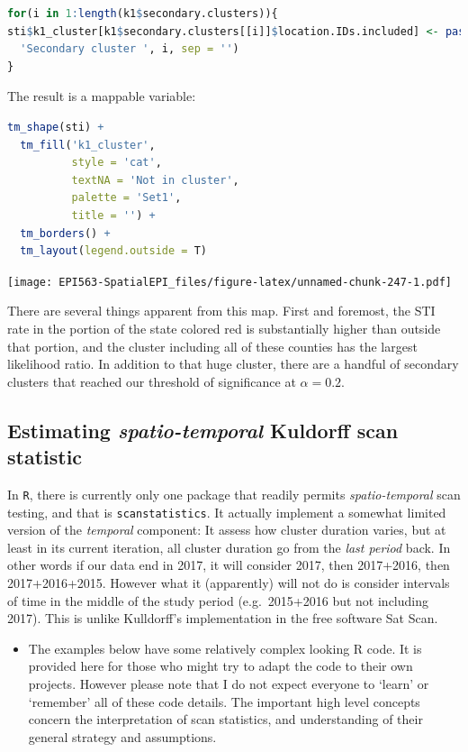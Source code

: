 \documentclass[
]{book}
\newcommand{\passthrough}[1]{#1}
\newenvironment{rmdblock}[1]
  {%
  \begin{itemize}
  \renewcommand{\labelitemi}{
    \raisebox{-.7\height}[0pt][0pt]{
      {\setkeys{Gin}{width=3em,keepaspectratio}\texttt{[image: images/\#1]}}
    }
  }
  \item
  }
  {
  \end{itemize}
  }
\newenvironment{rmdwarning}
  {\begin{rmdblock}{warning}}
  {\end{rmdblock}}
\begin{document}
\begin{lstlisting}[language=R]
for(i in 1:length(k1$secondary.clusters)){
sti$k1_cluster[k1$secondary.clusters[[i]]$location.IDs.included] <- paste(
  'Secondary cluster ', i, sep = '')
}
\end{lstlisting}

The result is a mappable variable:

\begin{lstlisting}[language=R]
tm_shape(sti) +
  tm_fill('k1_cluster',
          style = 'cat',
          textNA = 'Not in cluster',
          palette = 'Set1',
          title = '') + 
  tm_borders() + 
  tm_layout(legend.outside = T)
\end{lstlisting}

\texttt{[image: EPI563-SpatialEPI\_files/figure-latex/unnamed-chunk-247-1.pdf]}

There are several things apparent from this map. First and foremost, the STI rate in the portion of the state colored red is substantially higher than outside that portion, and the cluster including all of these counties has the largest likelihood ratio. In addition to that huge cluster, there are a handful of secondary clusters that reached our threshold of significance at \(\alpha = 0.2\).

\hypertarget{estimating-spatio-temporal-kuldorff-scan-statistic}{%
\subsection{\texorpdfstring{Estimating \emph{spatio-temporal} Kuldorff scan statistic}{Estimating spatio-temporal Kuldorff scan statistic}}\label{estimating-spatio-temporal-kuldorff-scan-statistic}}

In \passthrough{\lstinline!R!}, there is currently only one package that readily permits \emph{spatio-temporal} scan testing, and that is \passthrough{\lstinline!scanstatistics!}. It actually implement a somewhat limited version of the \emph{temporal} component: It assess how cluster duration varies, but at least in its current iteration, all cluster duration go from the \emph{last period} back. In other words if our data end in 2017, it will consider 2017, then 2017+2016, then 2017+2016+2015. However what it (apparently) will not do is consider intervals of time in the middle of the study period (e.g.~2015+2016 but not including 2017). This is unlike Kulldorff's implementation in the free software Sat Scan.

\begin{rmdwarning}
The examples below have some relatively complex looking R code. It is provided here for those who might try to adapt the code to their own projects. However please note that I do not expect everyone to `learn' or `remember' all of these code details. The important high level concepts concern the interpretation of scan statistics, and understanding of their general strategy and assumptions.
\end{rmdwarning}
\end{document}
